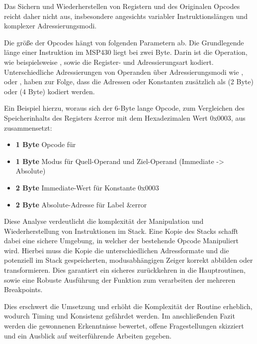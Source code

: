Das Sichern und Wiederherstellen von Registern und des Originalen Opcodes reicht daher nicht aus, insbesondere angesichts variabler Instruktionsl\"angen und komplexer Adressierungsmodi. 

Die gr\"o{\ss}e der Opcodes h\"angt von folgenden Parametern ab. Die Grundlegende l\"ange einer Instruktion im MSP430 liegt bei zwei Byte. Darin ist die Operation, wie beispielsweise , sowie die Register- und Adressierungsart kodiert. Unterschiedliche Adressierungen von Operanden \"uber Adressierungsmodi wie \glqq{}\grqq{}, \glqq{}\grqq{} oder \glqq{}\grqq{}, haben zur Folge, dass die Adressen oder Konstanten zus\"atzlich als  (2 Byte) oder  (4 Byte) kodiert werden.\\

Ein Beispiel hierzu, woraus sich der 6-Byte lange Opcode, zum Vergleichen des Speicherinhalts des Registers \glqq{}\&error\grqq{} mit dem Hexadezimalen Wert \glqq{}0x0003\grqq{}, aus  zusammensetzt: 
\\\textbf{} 
\begin{itemize}
	\item \textbf{1 Byte} Opcode f\"ur 
	\item \textbf{1 Byte} Modus f\"ur Quell-Operand und Ziel-Operand (Immediate -> Absolute)
	\item \textbf{2 Byte} Immediate-Wert f\"ur Konstante \glqq{}0x0003\grqq{}
	\item \textbf{2 Byte} Absolute-Adresse f\"ur Label \glqq{}\&error\grqq{}
\end{itemize}

\newpage
Diese Analyse verdeutlicht die komplexit\"at der Manipulation und Wiederherstellung von Instruktionen im Stack. Eine Kopie des Stacks schafft dabei eine sichere Umgebung, in welcher der bestehende Opcode Manipuliert wird. Hierbei muss die Kopie die unterschiedlichen Adressformate und die potenziell im Stack gespeicherten, modusabh\"angigen Zeiger korrekt abbilden oder transformieren. Dies garantiert ein sicheres zur\"uckkehren in die Hauptroutinen, sowie eine Robuste Ausf\"uhrung der Funktion zum verarbeiten der \ggf mehreren Breakpoints.

Dies erschwert die Umsetzung und erh\"oht die Komplexit\"at der Routine erheblich, wodurch Timing und Konsistenz gef\"ahrdet werden. Im anschlie{\ss}enden Fazit werden die gewonnenen Erkenntnisse bewertet, offene Fragestellungen skizziert und ein Ausblick auf weiterf\"uhrende Arbeiten gegeben.

